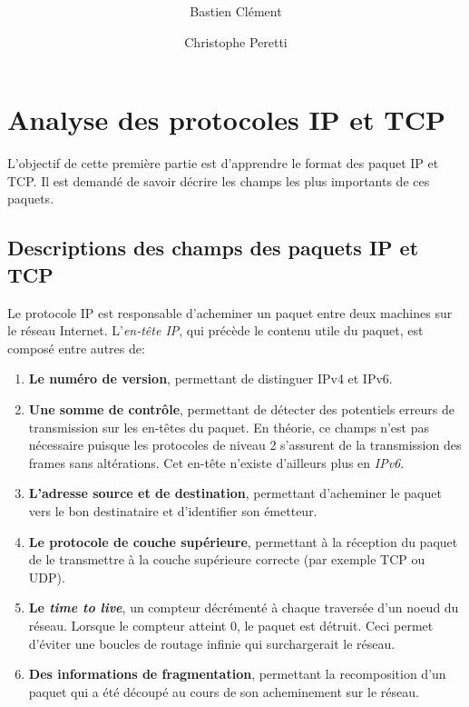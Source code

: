 \documentclass[11pt,a4paper]{article}
\author{Bastien Clément \and Christophe Peretti}
\title{{\normalsize \doccourse} \\ \doctitle }
\begin{document}
\maketitle
\vspace{1em}

\section{Analyse des protocoles IP et TCP}

L'objectif de cette première partie est d'apprendre le format des paquet IP et TCP. Il est demandé de savoir décrire les champs les plus importants de ces paquets.

\subsection{Descriptions des champs des paquets IP et TCP}

Le protocole IP est responsable d'acheminer un paquet entre deux machines sur le réseau Internet. L'\textit{en-tête IP}, qui précède le contenu utile du paquet, est composé entre autres de:

\begin{enumerate}
	\item \textbf{Le numéro de version}, permettant de distinguer IPv4 et IPv6.
	\item \textbf{Une somme de contrôle}, permettant de détecter des potentiels erreurs de transmission sur les en-têtes du paquet. En théorie, ce champs n'est pas nécessaire puisque les protocoles de niveau 2 s'assurent de la transmission des frames sans altérations. Cet en-tête n'existe d'ailleurs plus en \textit{IPv6}.
	\item \textbf{L'adresse source et de destination}, permettant d'acheminer le paquet vers le bon destinataire et d'identifier son émetteur.
	\item \textbf{Le protocole de couche supérieure}, permettant à la réception du paquet de le transmettre à la couche supérieure correcte (par exemple TCP ou UDP).
	\item \textbf{Le \textit{time to live}}, un compteur décrémenté à chaque traversée d'un noeud du réseau. Lorsque le compteur atteint 0, le paquet est détruit. Ceci permet d'éviter une boucles de routage infinie qui surchargerait le réseau.
	\item \textbf{Des informations de fragmentation}, permettant la recomposition d'un paquet qui a été découpé au cours de son acheminement sur le réseau.
\end{enumerate}
\end{document}
